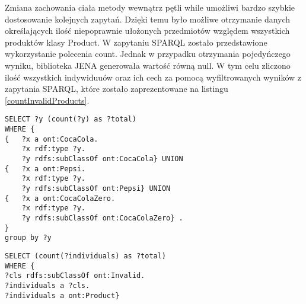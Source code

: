 \begin{itemize}
Zmiana zachowania ciała metody wewnątrz pętli while umożliwi bardzo szybkie dostosowanie kolejnych zapytań. Dzięki temu było możliwe otrzymanie danych określających ilość niepoprawnie ułożonych przedmiotów względem wszystkich produktów klasy Product. W zapytaniu SPARQL zostało przedstawione wykorzystanie polecenia count. Jednak w przypadku otrzymania pojedyńczego wyniku, biblioteka JENA generowała wartość równą null. W tym celu zliczono ilość wszystkich indywiduuów oraz ich cech za pomocą wyfiltrowanych wyników z zapytania SPARQL, które zostało zaprezentowane na listingu \ref{countInvalidProducts}.

\begin{lstlisting}[caption={Zapytanie SPARQL zliczające ilość sklasyfikowanych indywiduów.}, label={sparqlCountProducts}]
SELECT ?y (count(?y) as ?total)
WHERE {
{	?x a ont:CocaCola. 
	?x rdf:type ?y. 
	?y rdfs:subClassOf ont:CocaCola} UNION 
{ 	?x a ont:Pepsi.   
	?x rdf:type ?y.  
	?y rdfs:subClassOf ont:Pepsi} UNION 
{	?x a ont:CocaColaZero.  
	?x rdf:type ?y. 
	?y rdfs:subClassOf ont:CocaColaZero} .
}
group by ?y
\end{lstlisting}


\begin{lstlisting}[caption={Zliczenie niepoprawnie ułożonych przedmiotów.}, label={countInvalidProducts}]
SELECT (count(?individuals) as ?total)
WHERE {
?cls rdfs:subClassOf ont:Invalid.
?individuals a ?cls.
?individuals a ont:Product}
\end{lstlisting}




\end{itemize}